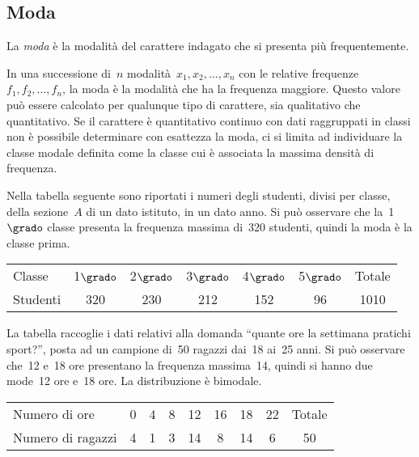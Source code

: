 \subsection{Moda}

\begin{definizione}
La \emph{moda} è la modalità del carattere indagato che si presenta più 
frequentemente.
\end{definizione}

In una successione di~$n$ modalità~$x_1, x_2, \ldots, x_n$
con le relative frequenze~$f_1, f_2, \ldots, f_n$, la moda è la modalità 
che ha la frequenza maggiore.
Questo valore può essere calcolato per qualunque tipo di carattere, sia 
qualitativo che quantitativo.
Se il carattere è quantitativo continuo con dati raggruppati in classi non 
è possibile determinare con esattezza la moda, ci si limita
ad individuare la classe modale definita come la classe cui è associata la 
massima densità di frequenza.

 \begin{esempio}

 Nella tabella seguente sono riportati i numeri degli studenti, divisi per 
classe, della sezione~$A$ di un dato istituto,
 in un dato anno. Si può osservare che la~1$\grado$ classe presenta la 
frequenza massima di~320 studenti, quindi la moda è la classe prima.
\begin{center}
\begin{tabular}{lcccccc}
\toprule
Classe & 1$\grado$ & 2$\grado$ & 3$\grado$ & 4$\grado$ & 5$\grado$ & Totale 
\\
Studenti & 320 & 230 & 212 & 152 & 96 & 1010 \\
\bottomrule
\end{tabular}
\end{center}
 \end{esempio}

\begin{esempio}
La tabella raccoglie i dati relativi alla domanda ``quante ore la settimana 
pratichi sport?'', posta ad un
campione di~50 ragazzi dai~18 ai~25 anni. Si può osservare che~12 e~18 ore 
presentano la frequenza massima~14, quindi si hanno due
mode~12 ore e~18 ore. La distribuzione è bimodale.


\begin{center}
\begin{tabular}{lcccccccc}
\toprule
Numero di ore & 0 &4 &8 &12 &16 &18 &22 &Totale\\
 Numero di ragazzi& 4 & 1 & 3 & 14 & 8 & 14 & 6 & 50 \\
\bottomrule
\end{tabular}
\end{center}
 \end{esempio}

